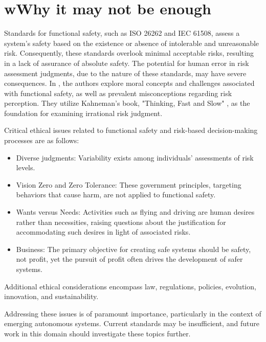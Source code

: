 \documentclass[./dissertation.tex]{subfiles}
\begin{document}
\section{wWhy it may not be enough}
Standards for functional safety, such as ISO 26262 and IEC 61508, assess a system's safety based on the existence or absence of intolerable and unreasonable risk. Consequently, these standards overlook minimal acceptable risks, resulting in a lack of assurance of absolute safety. The potential for human error in risk assessment judgments, due to the nature of these standards, may have severe consequences. In \cite{7958474}, the authors explore moral concepts and challenges associated with functional safety, as well as prevalent misconceptions regarding risk perception. They utilize Kahneman's book, "Thinking, Fast and Slow" \cite{daniel2017thinking}, as the foundation for examining irrational risk judgment.

Critical ethical issues related to functional safety and risk-based decision-making processes are as follows:

\begin{itemize}
\item Diverse judgments: Variability exists among individuals' assessments of risk levels.
\item Vision Zero and Zero Tolerance: These government principles, targeting behaviors that cause harm, are not applied to functional safety.
\item Wants versus Needs: Activities such as flying and driving are human desires rather than necessities, raising questions about the justification for accommodating such desires in light of associated risks.
\item Business: The primary objective for creating safe systems should be safety, not profit, yet the pursuit of profit often drives the development of safer systems.

\end{itemize}
Additional ethical considerations encompass law, regulations, policies, evolution, innovation, and sustainability.

Addressing these issues is of paramount importance, particularly in the context of emerging autonomous systems. Current standards may be insufficient, and future work in this domain should investigate these topics further.
\end{document}
